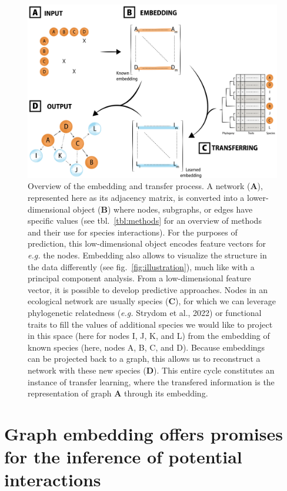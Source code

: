 \documentclass[11pt]{article}
\makeatletter
\def\maxwidth{\ifdim\Gin@nat@width>\linewidth\linewidth
\else\Gin@nat@width\fi}
\let\Oldincludegraphics\includegraphics
\renewcommand{\includegraphics}[1]{\Oldincludegraphics[width=\maxwidth]{#1}}
\makeatother
\begin{document}
\begin{figure}
\hypertarget{fig:embedding}{%
\centering
\includegraphics{figures/conceptual_2.png}
\caption{Overview of the embedding and transfer process. A network
(\textbf{A}), represented here as its adjacency matrix, is converted
into a lower-dimensional object (\textbf{B}) where nodes, subgraphs, or
edges have specific values (see tbl.~\ref{tbl:methods} for an overview
of methods and their use for species interactions). For the purposes of
prediction, this low-dimensional object encodes feature vectors for
\emph{e.g.} the nodes. Embedding also allows to visualize the structure
in the data differently (see fig.~\ref{fig:illustration}), much like
with a principal component analysis. From a low-dimensional feature
vector, it is possible to develop predictive approaches. Nodes in an
ecological network are usually species (\textbf{C}), for which we can
leverage phylogenetic relatedness (\emph{e.g.} Strydom et al., 2022) or
functional traits to fill the values of additional species we would like
to project in this space (here for nodes I, J, K, and L) from the
embedding of known species (here, nodes A, B, C, and D). Because
embeddings can be projected back to a graph, this allows us to
reconstruct a network with these new species (\textbf{D}). This entire
cycle constitutes an instance of transfer learning, where the transfered
information is the representation of graph \textbf{A} through its
embedding.}\label{fig:embedding}
}
\end{figure}

\hypertarget{graph-embedding-offers-promises-for-the-inference-of-potential-interactions}{%
\section{Graph embedding offers promises for the inference of potential
interactions}\label{graph-embedding-offers-promises-for-the-inference-of-potential-interactions}}
\end{document}
